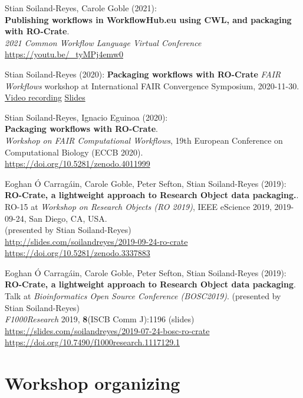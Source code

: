 Stian Soiland-Reyes, Carole Goble (2021):\\
{\textbf{Publishing workflows in WorkflowHub.eu using CWL, and packaging with RO-Crate}}.\\
\emph{2021 Common Workflow Language Virtual Conference}\\
\url{https://youtu.be/_tyMPj4emw0}

Stian Soiland-Reyes (2020):
\textbf{Packaging workflows with RO-Crate} 
\emph{FAIR Workflows} workshop at
{International FAIR Convergence Symposium}, 2020-11-30.
\href{https://vimeo.com/499270810}{Video recording}
\href{https://drive.google.com/file/d/1lYAdqm7RESqA9zplTXd4JFJUmome66ui}{Slides}

Stian Soiland-Reyes, Ignacio Eguinoa (2020):\\
\textbf{Packaging workflows with RO-Crate}.\\
{\emph{Workshop on FAIR Computational Workflows}}, 19th European Conference on
Computational Biology
({ECCB 2020}).\\
\url{https://doi.org/10.5281/zenodo.4011999}

Eoghan Ó Carragáin, Carole Goble, Peter Sefton, Stian Soiland-Reyes
(2019):\\
\textbf{RO-Crate, a lightweight approach to Research Object data packaging.}.\\
RO-15 at \emph{Workshop on Research Objects
(RO 2019)}, IEEE eScience 2019, 2019-09-24, San Diego, CA, USA.\\
(presented by Stian Soiland-Reyes)\\
\url{http://slides.com/soilandreyes/2019-09-24-ro-crate}\\
\url{https://doi.org/10.5281/zenodo.3337883}

Eoghan Ó Carragáin, Carole Goble, Peter Sefton, Stian Soiland-Reyes
(2019):\\
\textbf{RO-Crate, a lightweight approach to Research Object data packaging}.\\
Talk at \emph{Bioinformatics Open Source Conference (BOSC2019)}.
(presented by Stian Soiland-Reyes)\\
\emph{F1000Research} 2019, \textbf{8}(ISCB Comm J):1196 (slides)\\
\url{https://slides.com/soilandreyes/2019-07-24-bosc-ro-crate}\\
\url{https://doi.org/10.7490/f1000research.1117129.1}


\section{Workshop organizing}

